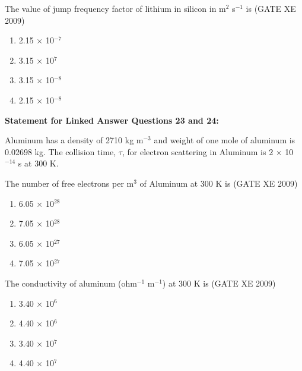     \item The value of jump frequency factor of lithium in silicon in m$^2$ s$^{-1}$ is \hfill (GATE XE 2009)
    \begin{multicols}{4}
        \begin{enumerate}
            \item 2.15 $\times$ 10$^{-7}$
            \item 3.15 $\times$ 10$^{7}$
            \item 3.15 $\times$ 10$^{-8}$
            \item 2.15 $\times$ 10$^{-8}$
        \end{enumerate}
    \end{multicols}


    \item[] \textbf{Statement for Linked Answer Questions 23 and 24:}

    Aluminum has a density of 2710 kg m$^{-3}$ and weight of one mole of aluminum is 0.02698 kg. The collision time, $\tau$, for electron scattering in Aluminum is 2 $\times$ 10$^{-14}$ s at 300 K.

    \item The number of free electrons per m$^3$ of Aluminum at 300 K is \hfill (GATE XE 2009)
    \begin{multicols}{4}
        \begin{enumerate}
            \item 6.05 $\times$ 10$^{28}$
            \item 7.05 $\times$ 10$^{28}$
            \item 6.05 $\times$ 10$^{27}$
            \item 7.05 $\times$ 10$^{27}$
        \end{enumerate}
    \end{multicols}

    \item The conductivity of aluminum (ohm$^{-1}$ m$^{-1}$) at 300 K is \hfill (GATE XE 2009)
    \begin{multicols}{4}
        \begin{enumerate}
            \item 3.40 $\times$ 10$^{6}$
            \item 4.40 $\times$ 10$^{6}$
            \item 3.40 $\times$ 10$^{7}$
            \item 4.40 $\times$ 10$^{7}$
        \end{enumerate}
    \end{multicols}
